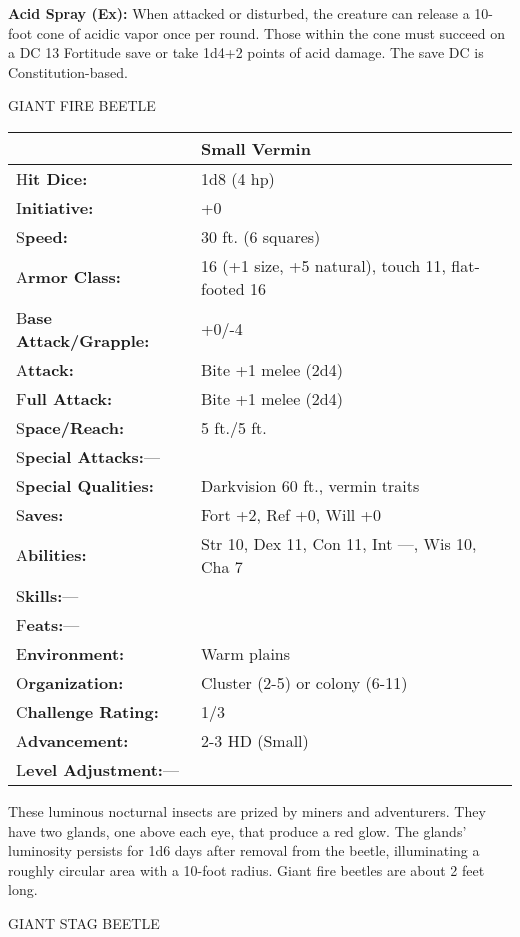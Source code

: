 \documentclass{article}
\begin{document}
\textbf{Acid Spray (Ex):} When attacked or disturbed, the creature can release 
a 10-foot cone of acidic vapor once per round. Those within the cone must succeed 
on a DC 13 Fortitude save or take 1d4+2 points of acid damage. The save DC is Constitution-based.

\vspace{12pt}
GIANT FIRE BEETLE

\begin{tabular}{|>{\raggedright}p{91pt}|>{\raggedright}p{192pt}|}
\hline
  & Small Vermin\tabularnewline
\hline
H\textbf{it Dice:} & 1d8 (4 hp)\tabularnewline
\hline
I\textbf{nitiative:} & +0\tabularnewline
\hline
S\textbf{peed:} & 30 ft. (6 squares)\tabularnewline
\hline
A\textbf{rmor Class:} & 16 (+1 size, +5 natural), touch 11, flat-footed 16\tabularnewline
\hline
B\textbf{ase Attack/Grapple:} & +0/-4\tabularnewline
\hline
A\textbf{ttack:} & Bite +1 melee (2d4)\tabularnewline
\hline
F\textbf{ull Attack:} & Bite +1 melee (2d4)\tabularnewline
\hline
S\textbf{pace/Reach:} & 5 ft./5 ft.\tabularnewline
\hline
S\textbf{pecial Attacks:}--- & \tabularnewline
\hline
S\textbf{pecial Qualities:} & Darkvision 60 ft., vermin traits\tabularnewline
\hline
S\textbf{aves:} & Fort +2, Ref +0, Will +0\tabularnewline
\hline
A\textbf{bilities:} & Str 10, Dex 11, Con 11, Int ---, Wis 10, Cha 7\tabularnewline
\hline
S\textbf{kills:}--- & \tabularnewline
\hline
F\textbf{eats:}--- & \tabularnewline
\hline
E\textbf{nvironment:} & Warm plains\tabularnewline
\hline
O\textbf{rganization:} & Cluster (2-5) or colony (6-11)\tabularnewline
\hline
C\textbf{hallenge Rating:} & 1/3\tabularnewline
\hline
A\textbf{dvancement:} & 2-3 HD (Small)\tabularnewline
\hline
L\textbf{evel Adjustment:}--- & \tabularnewline
\hline
\end{tabular}

These luminous nocturnal insects are prized by miners and adventurers. They have 
two glands, one above each eye, that produce a red glow. The glands' luminosity 
persists for 1d6 days after removal from the beetle, illuminating a roughly circular 
area with a 10-foot radius. Giant fire beetles are about 2 feet long.

\vspace{12pt}
GIANT STAG BEETLE
\end{document}
